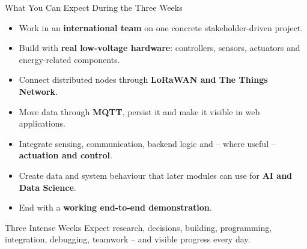 \begin{frame}{What You Can Expect During the Three Weeks}
\begin{itemize}
    \item Work in an \textbf{international team} on one concrete stakeholder-driven project.
    \item Build with \textbf{real low-voltage hardware}: controllers, sensors, actuators and energy-related components.
    \item Connect distributed nodes through \textbf{LoRaWAN and The Things Network}.
    \item Move data through \textbf{MQTT}, persist it and make it visible in web applications.
    \item Integrate sensing, communication, backend logic and -- where useful -- \textbf{actuation and control}.
    \item Create data and system behaviour that later modules can use for \textbf{AI and Data Science}.
    \item End with a \textbf{working end-to-end demonstration}.
\end{itemize}
\begin{alertblock}{Three Intense Weeks}
Expect research, decisions, building, programming, integration, debugging, teamwork -- and visible progress every day.
\end{alertblock}
\end{frame}
